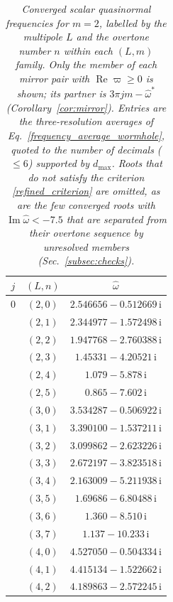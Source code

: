 \begin{table}[H]
\caption{\textit{Converged scalar quasinormal frequencies for $m=2$, labelled by the multipole $L$ and the overtone number $n$ within each $(L,m)$ family. Only the member of each mirror pair with $\operatorname{Re}\varpi\geq0$ is shown; its partner is $3\pi jm-\widehat{\omega}^{*}$ (Corollary~\ref{cor:mirror}). Entries are the three-resolution averages of Eq.~\eqref{frequency_average_wormhole}, quoted to the number of decimals ($\leq6$) supported by $d_{\max}$. Roots that do not satisfy the criterion \eqref{refined_criterion} are omitted, as are the few converged roots with $\operatorname{Im}\widehat{\omega}<-7.5$ that are separated from their overtone sequence by unresolved members (Sec.~\ref{subsec:checks}).}}
\label{tab:qnm-m2}
\centering
\begingroup
\scriptsize
\setlength{\tabcolsep}{3.0pt}
\setlength{\arrayrulewidth}{0.4pt}
\renewcommand{\arraystretch}{1.08}
\begin{minipage}[t]{0.325\textwidth}
\centering
\begin{tabular}[t]{|c|c|c|}
\hline
$j$ & $(L,n)$ & $\widehat{\omega}$ \\
\hline
$0$ & $(2,0)$ & $2.546656-0.512669\,\mathrm{i}$ \\
 & $(2,1)$ & $2.344977-1.572498\,\mathrm{i}$ \\
 & $(2,2)$ & $1.947768-2.760388\,\mathrm{i}$ \\
 & $(2,3)$ & $1.45331-4.20521\,\mathrm{i}$ \\
 & $(2,4)$ & $1.079-5.878\,\mathrm{i}$ \\
 & $(2,5)$ & $0.865-7.602\,\mathrm{i}$ \\
 & $(3,0)$ & $3.534287-0.506922\,\mathrm{i}$ \\
 & $(3,1)$ & $3.390100-1.537211\,\mathrm{i}$ \\
 & $(3,2)$ & $3.099862-2.623226\,\mathrm{i}$ \\
 & $(3,3)$ & $2.672197-3.823518\,\mathrm{i}$ \\
 & $(3,4)$ & $2.163009-5.211938\,\mathrm{i}$ \\
 & $(3,5)$ & $1.69686-6.80488\,\mathrm{i}$ \\
 & $(3,6)$ & $1.360-8.510\,\mathrm{i}$ \\
 & $(3,7)$ & $1.137-10.233\,\mathrm{i}$ \\
 & $(4,0)$ & $4.527050-0.504334\,\mathrm{i}$ \\
 & $(4,1)$ & $4.415134-1.522662\,\mathrm{i}$ \\
 & $(4,2)$ & $4.189863-2.572245\,\mathrm{i}$ \\

\end{tabular}
\end{minipage}
\end{table}

